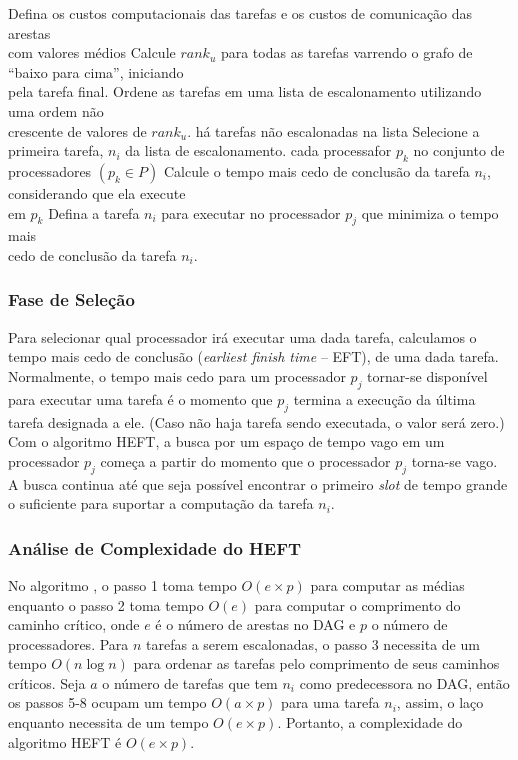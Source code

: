 \begin{codebox}
\li	Defina os custos computacionais das tarefas e os custos de comunicação das
	arestas \\com valores médios
\li	Calcule $rank_u$ para todas as tarefas varrendo o grafo de ``baixo para cima'',
	iniciando \\pela tarefa final.
\li Ordene as tarefas em uma lista de escalonamento utilizando uma ordem não \\
	crescente de valores de $rank_u$.
\li 	\While há tarefas não escalonadas na lista
\li 		\Do
				Selecione a primeira tarefa, $n_i$ da lista de escalonamento.
\li				\For cada processafor $p_k$ no conjunto de processadores $(p_k \in P)$
\li 				\Do
						Calcule o tempo mais cedo de conclusão da tarefa  $n_i$,
						considerando que ela execute \\em $p_k$
					\End
\li				Defina a tarefa $n_i$ para executar no processador $p_j$ que
					minimiza o tempo mais\\ cedo de conclusão da tarefa $n_i$.
			\End
\End
\end{codebox}

\subsubsection{Fase de Seleção}
Para selecionar qual processador irá executar uma dada tarefa, calculamos o
tempo mais cedo de conclusão (\emph{earliest finish time} -- EFT), de uma dada
tarefa. Normalmente, o tempo mais cedo para um processador $p_j$ tornar-se
disponível para executar uma tarefa é o momento que $p_j$ termina a execução
da última tarefa designada a ele. (Caso não haja tarefa sendo executada, 
o valor será zero.) Com o algoritmo HEFT, a busca por um espaço de tempo vago
em um processador $p_j$ começa a partir do momento que o processador $p_j$ 
torna-se vago. A busca continua até que seja possível encontrar 
o primeiro \emph{slot} de tempo grande o suficiente para suportar a computação
da tarefa $n_i$.

\subsubsection{Análise de Complexidade do HEFT}
No algoritmo , o passo 1 toma tempo
$O(e \times p)$ para computar as médias enquanto o passo 2 toma tempo $O(e)$ para 
computar o comprimento do caminho crítico, onde $e$ é o número de arestas no 
DAG e $p$ o número de processadores. Para $n$ tarefas a serem escalonadas, 
o passo 3 necessita de um tempo $O(n \log n)$ para ordenar as tarefas pelo
comprimento de seus caminhos críticos. Seja $a$ o número de tarefas que tem
$n_i$ como predecessora no DAG, então os passos 5-8 ocupam um tempo
$O(a \times p)$ para uma tarefa $n_i$, assim, o laço enquanto necessita de um 
tempo $O(e \times p)$. Portanto, a complexidade do algoritmo HEFT é  $O(e
\times p)$.


